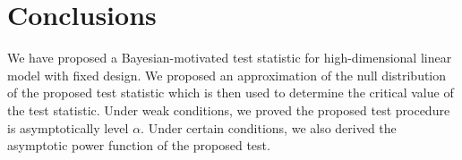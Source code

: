 \documentclass[11pt]{article}
\newcommand{\bfsym}[1]{\ensuremath{\boldsymbol{#1}}}
\def\bbeta{\bfsym \beta}
\theoremstyle{plain}
\theoremstyle{definition}
\theoremstyle{remark}
\begin{document}
%
%









\section{Conclusions}\label{sec:conclusions}
We have proposed a Bayesian-motivated test statistic for high-dimensional linear model with fixed design.
We proposed an approximation of the null distribution of the proposed test statistic which is then used to determine the critical value of the test statistic.
Under weak conditions, we proved the proposed test procedure is asymptotically level $\alpha$.
Under certain conditions, we also derived the asymptotic power function of the proposed test.
\end{document}
